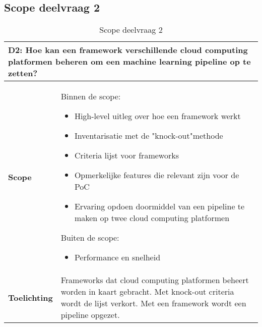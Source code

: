 \subsection*{Scope deelvraag 2}\label{appendix:scope-subquestion-2}
\begin{table}[hbt!]
  \centering
  \begin{tabular}{|p{.215\linewidth}|p{.72\linewidth}|}
  \hline
  \multicolumn{2}{|p{.97\linewidth}|}{\textbf{D2: Hoe kan een framework verschillende cloud computing platformen beheren om een machine learning pipeline op te zetten?}} \\ \hline
    \textbf{Scope}&
      Binnen de scope:
      \begin{itemize}
        \item High-level uitleg over hoe een framework werkt
        \item Inventarisatie met de "knock-out"\space methode
        \item Criteria lijst voor frameworks
        \item Opmerkelijke features die relevant zijn voor de PoC
        \item Ervaring opdoen doormiddel van een pipeline te maken op twee cloud computing platformen
      \end{itemize}
      Buiten de scope:
      \begin{itemize}
        \item Performance en snelheid
      \end{itemize}
    \\ \hline
    \textbf{Toelichting}&
      Frameworks dat cloud computing platformen beheert worden in kaart gebracht. Met knock-out criteria wordt de lijst verkort. Met een framework wordt een pipeline opgezet.
    \\ \hline
  \end{tabular}
  \caption{Scope deelvraag 2}
  \label{table:scope-subquestion-2}
  \end{table}

